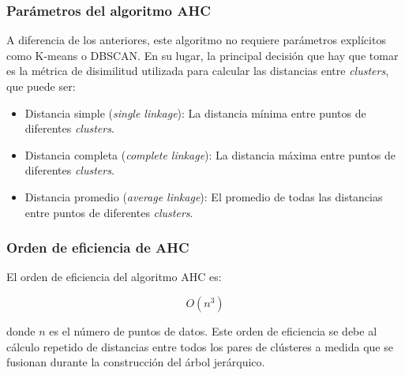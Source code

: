 \vspace{-0.1cm}

\subsubsection*{Parámetros del algoritmo \gls{AHC}}

A diferencia de los anteriores, este algoritmo no requiere parámetros explícitos como K-means o \gls{DBSCAN}. En su lugar, la principal decisión que hay que tomar es la métrica de disimilitud \footnotemark utilizada para calcular las distancias entre \textit{clusters}, que puede ser:

\begin{itemize}
    \item Distancia simple (\textit{single linkage}): La distancia mínima entre puntos de diferentes \textit{clusters}. \\
    \item Distancia completa (\textit{complete linkage}): La distancia máxima entre puntos de diferentes \textit{clusters}.\\
    \item Distancia promedio (\textit{average linkage}): El promedio de todas las distancias entre puntos de diferentes \textit{clusters}.
\end{itemize}


\vspace{-3mm}

\subsubsection*{Orden de eficiencia de AHC}

El orden de eficiencia del algoritmo AHC es:

\vspace{-0.2cm}

\begin{equation}
    O(n^3)
\end{equation}

donde \( n \) es el número de puntos de datos. Este orden de eficiencia se debe al cálculo repetido de distancias entre todos los pares de clústeres a medida que se fusionan durante la construcción del árbol jerárquico. \\

